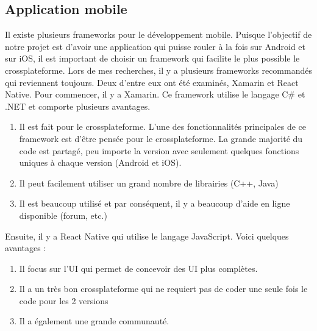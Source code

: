 \documentclass[12pt,fleqn]{article}
\begin{document}


\subsection{Application mobile}
Il existe plusieurs frameworks pour le développement mobile. Puisque l’objectif de notre projet est d’avoir une application qui puisse rouler à la fois sur Android et sur iOS, il est important de choisir un framework qui facilite le plus possible le crossplateforme. Lors de mes recherches, il y a plusieurs frameworks recommandés qui reviennent toujours. Deux d’entre eux ont été examinés, Xamarin et React Native.
Pour commencer, il y a Xamarin. Ce framework utilise le langage C\# et .NET et comporte plusieurs avantages. 
\begin{enumerate}
	\item Il est fait pour le crossplateforme. L’une des fonctionnalités principales de ce framework est d’être pensée pour le crossplateforme. La grande majorité du code est partagé, peu importe la version avec seulement quelques fonctions uniques à chaque version (Android et iOS).
 	\item Il peut facilement utiliser un grand nombre de librairies (C++, Java)
	\item Il est beaucoup utilisé et par conséquent, il y a beaucoup d’aide en ligne disponible (forum, etc.)
\end{enumerate}
Ensuite, il y a React Native qui utilise le langage JavaScript. Voici quelques avantages :
\begin{enumerate}
	\item Il focus sur l’UI qui permet de concevoir des UI plus complètes.
	\item Il a un très bon crossplateforme qui ne requiert pas de coder une seule fois le code pour les 2 versions
	\item Il a également une grande communauté.
\end{enumerate}
\end{document}
